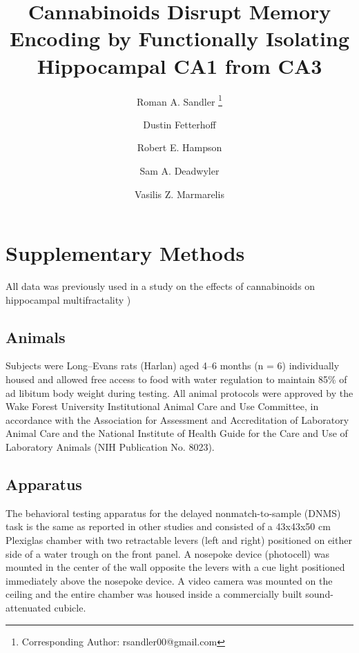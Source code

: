 \documentclass[11pt,a4paper,final]{article}
\title{\vspace{-30mm}\fontsize{14pt}{1pt}\textbf{Cannabinoids Disrupt Memory Encoding by Functionally Isolating Hippocampal CA1 from CA3}} %
\author[1]{Roman A. Sandler     \thanks{Corresponding Author: rsandler00@gmail.com}}
\author[2]{Dustin Fetterhoff    }   %
\author[2]{Robert E. Hampson    }	%
\author[2]{Sam A. Deadwyler     }	%
\author[1]{Vasilis Z. Marmarelis}
\affil[1]{Department of Biomedical Engineering, University of Southern California, Los Angeles, CA, USA}
\affil[2]{Department of Physiology \& Pharmacology, Wake Forest University, Winston-Salem, NC, USA}
\begin{document}
\maketitle %


\appendix
\renewcommand\thefigure{S\arabic{figure}} 
\setcounter{figure}{0} 

\section{Supplementary Methods \label{SM}}

All data was previously used in a study on the effects of cannabinoids on hippocampal multifractality \citep{dustin14,dustin15})

    \subsection{Animals}
Subjects were Long–Evans rats (Harlan) aged 4–6 months (n = 6) individually housed and allowed free access to food with water regulation to maintain 85\% of ad libitum body weight during testing.
All animal protocols were approved by the Wake Forest University Institutional Animal Care and Use Committee, in accordance with the Association for Assessment and Accreditation of Laboratory Animal Care and the National Institute of Health Guide for the Care and Use of Laboratory Animals (NIH Publication No. 8023).

    \subsection{Apparatus}
The behavioral testing apparatus for the delayed nonmatch-to-sample (DNMS) task is the same as reported in other studies \citep{hampson00} and consisted of a 43x43x50 cm Plexiglas chamber with two retractable levers (left and right) positioned on either side of a water trough on the front panel.
A nosepoke device (photocell) was mounted in the center of the wall opposite the levers with a cue light positioned immediately above the nosepoke device.
A video camera was mounted on the ceiling and the entire chamber was housed inside a commercially built sound-attenuated cubicle.
\end{document}
